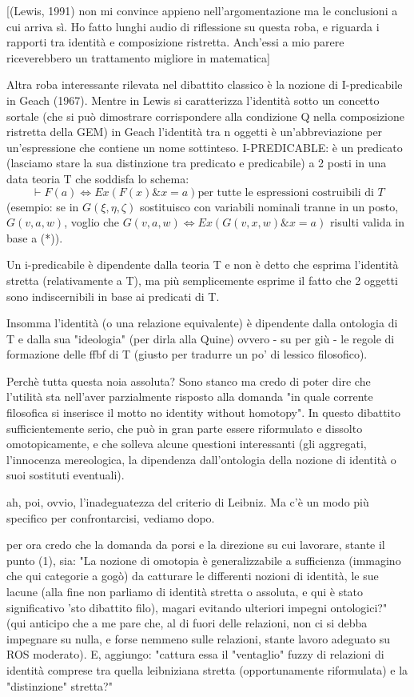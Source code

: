 \documentclass{amsart}
\begin{document}
[(Lewis, 1991) non mi convince appieno nell'argomentazione ma le conclusioni a cui arriva sì. Ho fatto lunghi audio di riflessione su questa roba, e riguarda i rapporti tra identità e composizione ristretta. Anch'essi a mio parere riceverebbero un trattamento migliore in matematica]

Altra roba interessante rilevata nel dibattito classico è la nozione di I-predicabile in Geach (1967). Mentre in Lewis si caratterizza l'identità sotto un concetto sortale (che si può dimostrare corrispondere alla condizione Q nella composizione ristretta della GEM) in Geach l'identità tra n oggetti è un'abbreviazione per un'espressione che contiene un nome sottinteso. 
I-PREDICABLE: è un predicato (lasciamo stare la sua distinzione tra predicato e predicabile) a 2 posti in una data teoria T che soddisfa lo schema:
\[\tag{$\star$}
\vdash F(a) \iff Ex (F(x) \& x=a)	\text{per tutte le espressioni costruibili di } T
\]
(esempio: se in $G(\xi, \eta, \zeta)$ sostituisco con variabili nominali tranne in un posto, $G(v,a,w)$,  voglio che $G(v,a,w) \iff Ex (G(v,x,w) \& x=a)$ risulti valida in base a (*)).

Un i-predicabile è dipendente dalla teoria T e non è detto che esprima l'identità stretta (relativamente a T), ma più semplicemente esprime il fatto che 2 oggetti sono indiscernibili in base ai predicati di T.

Insomma l'identità (o una relazione equivalente) è dipendente dalla ontologia di T e dalla sua "ideologia" (per dirla alla Quine) ovvero - su per giù - le regole di formazione delle ffbf di T (giusto per tradurre un po' di lessico filosofico). 

Perchè tutta questa noia assoluta? Sono stanco ma credo di poter dire che l'utilità sta nell'aver parzialmente risposto alla domanda "in quale corrente filosofica si inserisce il motto no identity without homotopy". In questo dibattito sufficientemente serio, che può in gran parte essere riformulato e dissolto omotopicamente, e che solleva alcune questioni interessanti (gli aggregati, l'innocenza mereologica, la dipendenza dall'ontologia della nozione di identità o suoi sostituti eventuali). 

ah, poi, ovvio, l'inadeguatezza del criterio di Leibniz. Ma c'è un modo più specifico per confrontarcisi, vediamo dopo.

per ora credo che la domanda da porsi e la direzione su cui lavorare, stante il punto (1), sia: "La nozione di omotopia è generalizzabile a sufficienza (immagino che qui categorie a gogò) da catturare le differenti nozioni di identità, le sue lacune (alla fine non parliamo di identità stretta o assoluta, e qui è stato significativo 'sto dibattito filo), magari evitando ulteriori impegni ontologici?" (qui anticipo che a me pare che, al di fuori delle relazioni, non ci si debba impegnare su nulla, e forse nemmeno sulle relazioni, stante lavoro adeguato su ROS moderato). E, aggiungo: "cattura essa il "ventaglio" fuzzy di relazioni di identità comprese tra quella leibniziana stretta (opportunamente riformulata) e la "distinzione" stretta?"
\end{document}
